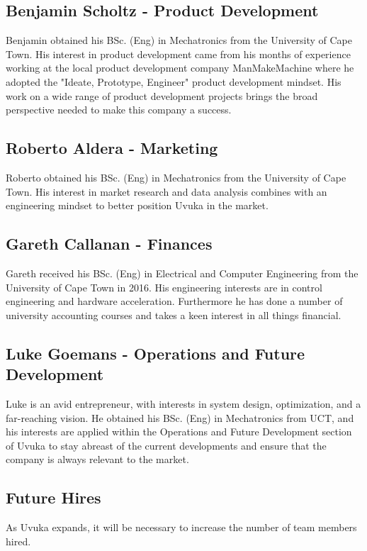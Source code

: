 \subsection{Benjamin Scholtz - Product Development}
Benjamin obtained his BSc. (Eng) in Mechatronics from the University of Cape Town. His interest in product development came from his months of experience working at the local product development company ManMakeMachine where he adopted the "Ideate, Prototype, Engineer" product development mindset. His work on a wide range of product development projects brings the broad perspective needed to make this company a success.  

\subsection{Roberto Aldera - Marketing}
Roberto obtained his BSc. (Eng) in Mechatronics from the University of Cape Town. His interest in market research and data analysis combines with an engineering mindset to better position Uvuka in the market.

\subsection{Gareth Callanan - Finances}
Gareth received his BSc. (Eng) in Electrical and Computer Engineering from the University of Cape Town in 2016. His engineering interests are in control engineering and hardware acceleration. Furthermore he has done a number of university accounting courses and takes a keen interest in all things financial. 

\subsection{Luke Goemans - Operations and Future Development}
Luke is an avid entrepreneur, with interests in system design, optimization, and a far-reaching vision. He obtained his BSc. (Eng) in Mechatronics from UCT, and his interests are applied within the Operations and Future Development section of Uvuka to stay abreast of the current developments and ensure that the company is always relevant to the market.

\subsection{Future Hires}

As Uvuka expands, it will be necessary to increase the number of team members hired. 

